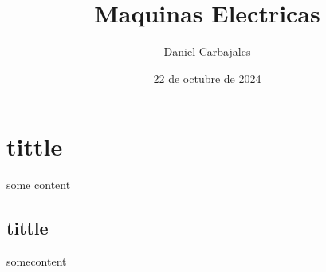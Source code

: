 \documentclass{report}
\title{\Huge{Maquinas Electricas}}
\author{\large{Daniel Carbajales}}
\date{22 de octubre de 2024}
\begin{document}


\label{chapter:NUMBER}  %
\section{tittle}\label{sec:tittle}
some content
\subsection{tittle}\label{subsec:tittle}
somecontent
\end{document}
